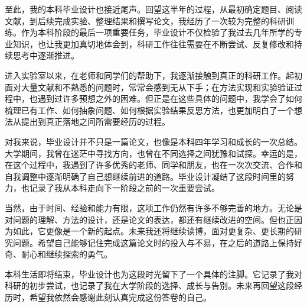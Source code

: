 
\begin{designsummary}
至此，我的本科毕业设计也接近尾声。回望这半年的过程，从最初确定题目、阅读文献，到后续完成实验、整理结果和撰写论文，我经历了一次较为完整的科研训练。作为本科阶段的最后一项重要任务，毕业设计不仅检验了我过去几年所学的专业知识，也让我更加真切地体会到，科研工作往往需要在不断尝试、反复修改和持续思考中逐渐推进。

进入实验室以来，在老师和同学们的帮助下，我逐渐接触到真正的科研工作。起初面对大量文献和不熟悉的问题时，常常会感到无从下手；在方法实现和实验验证过程中，也遇到过许多预想之外的困难。但正是在这些具体的问题中，我学会了如何梳理已有工作、如何抽象问题、如何根据实验结果反思方法，也更加明白了一个想法从提出到真正落地之间所需要经历的过程。

对我来说，毕业设计并不只是一篇论文，也像是本科四年学习和成长的一次总结。大学期间，我曾在迷茫中寻找方向，也曾在不同选择之间犹豫和试探。幸运的是，在这个过程中，我遇到了许多优秀的老师、同学和朋友，也在一次次交流、合作和自我调整中逐渐明确了自己想继续前进的道路。毕业设计凝结了这段时间里的努力，也记录了我从本科走向下一阶段之前的一次重要尝试。

当然，由于时间、经验和能力有限，这项工作仍然有许多不够完善的地方。无论是对问题的理解、方法的设计，还是论文的表达，都还有继续改进的空间。但也正因为如此，它更像是一个新的起点。未来我还将继续读博，面对更复杂、更长期的研究问题。希望自己能够记住完成这篇论文时的投入与不易，在之后的道路上保持好奇、耐心和继续探索的勇气。

本科生活即将结束，毕业设计也为这段时光留下了一个具体的注脚。它记录了我对科研的初步尝试，也记录了我在大学阶段的选择、成长与告别。未来再回望这段经历时，希望我依然会感谢此刻认真完成这份答卷的自己。
\end{designsummary}
